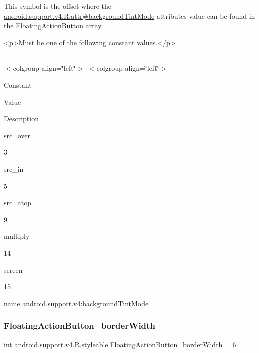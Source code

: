 This symbol is the offset where the \hyperlink{classandroid_1_1support_1_1v4_1_1R_1_1attr_a7169568146e422cf98009d4a36ee607c}{android.\+support.\+v4.\+R.\+attr\#background\+Tint\+Mode} attribute\textquotesingle{}s value can be found in the \hyperlink{classandroid_1_1support_1_1v4_1_1R_1_1styleable_ad3363bb32f8e5e0dde36b5e32146816b}{Floating\+Action\+Button} array.

\begin{DoxyVerb}      <p>Must be one of the following constant values.</p>
\end{DoxyVerb}
 \tabulinesep=1mm
\begin{longtabu} spread 0pt [c]{*{0}{|X[-1]}|}
\hline
\end{longtabu}
$<$colgroup align=\char`\"{}left\char`\"{}$>$ $<$colgroup align=\char`\"{}left\char`\"{}$>$ 

Constant

Value

Description 

{\ttfamily src\+\_\+over}

3

{\ttfamily src\+\_\+in}

5

{\ttfamily src\+\_\+atop}

9

{\ttfamily multiply}

14

{\ttfamily screen}

15

name android.\+support.\+v4\+:background\+Tint\+Mode \mbox{\label{classandroid_1_1support_1_1v4_1_1R_1_1styleable_acfbadae3c3154a5b70a3e70615553f1c}} 
\subsubsection{\texorpdfstring{Floating\+Action\+Button\+\_\+border\+Width}{FloatingActionButton\_borderWidth}}
{\footnotesize\ttfamily int android.\+support.\+v4.\+R.\+styleable.\+Floating\+Action\+Button\+\_\+border\+Width = 6\hspace{0.3cm}{\ttfamily [static]}}

